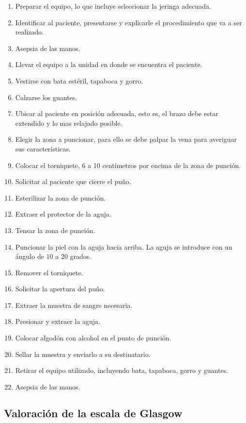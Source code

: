 \begin{enumerate}
\item Preparar el equipo, lo que incluye seleccionar la jeringa adecuada.
\item Identificar al paciente, presentarse y explicarle el procedimiento que va
    a ser realizado.
\item Asepsia de las manos.
\item Llevar el equipo a la unidad en donde se encuentra el paciente.
\item Vestirse con bata estéril, tapaboca y gorro.
\item Calzarse los guantes.
\item Ubicar al paciente en posición adecuada, esto es, el brazo debe estar
    extendido y lo mas relajado posible.
\item Elegir la zona a puncionar, para ello se debe palpar la vena para
    averiguar sus características.
\item Colocar el torniquete, 6 a 10 centímetros por encima de la zona de
    punción.
\item Solicitar al paciente que cierre el puño.
\item Esterilizar la zona de punción.
\item Extraer el protector de la aguja.
\item Tensar la zona de punción.
\item Puncionar la piel con la aguja hacia arriba. La aguja se introduce con un
    ángulo de $10$ a $20$ grados.
\item Remover el torniquete.
\item Solicitar la apertura del puño.
\item Extraer la muestra de sangre necesaria.
\item Presionar y extraer la aguja.
\item Colocar algodón con alcohol en el punto de punción.
\item Sellar la muestra y enviarlo a su destinatario.
\item Retirar el equipo utilizado, incluyendo bata, tapaboca, gorro y guantes.
\item Asepsia de las manos.
\end{enumerate}


\subsection{Valoración de la escala de Glasgow}
\label{sec:glasgow}

